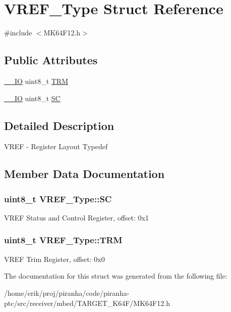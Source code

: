 \hypertarget{structVREF__Type}{}\section{V\+R\+E\+F\+\_\+\+Type Struct Reference}
\label{structVREF__Type}


{\ttfamily \#include $<$M\+K64\+F12.\+h$>$}

\subsection*{Public Attributes}
\begin{DoxyCompactItemize}
\item 
\hyperlink{core__sc300_8h_aec43007d9998a0a0e01faede4133d6be}{\+\_\+\+\_\+\+IO} uint8\+\_\+t \hyperlink{structVREF__Type_a374f2e0a8c240329890c6847d8560737}{T\+RM}
\item 
\hyperlink{core__sc300_8h_aec43007d9998a0a0e01faede4133d6be}{\+\_\+\+\_\+\+IO} uint8\+\_\+t \hyperlink{structVREF__Type_a93380066788c4a4c715990e2d34ec5b1}{SC}
\end{DoxyCompactItemize}


\subsection{Detailed Description}
V\+R\+EF -\/ Register Layout Typedef 

\subsection{Member Data Documentation}
\subsubsection[{\texorpdfstring{SC}{SC}}]{ uint8\+\_\+t V\+R\+E\+F\+\_\+\+Type\+::\+SC}\hypertarget{structVREF__Type_a93380066788c4a4c715990e2d34ec5b1}{}\label{structVREF__Type_a93380066788c4a4c715990e2d34ec5b1}
V\+R\+EF Status and Control Register, offset\+: 0x1 
\subsubsection[{\texorpdfstring{T\+RM}{TRM}}]{ uint8\+\_\+t V\+R\+E\+F\+\_\+\+Type\+::\+T\+RM}\hypertarget{structVREF__Type_a374f2e0a8c240329890c6847d8560737}{}\label{structVREF__Type_a374f2e0a8c240329890c6847d8560737}
V\+R\+EF Trim Register, offset\+: 0x0 

The documentation for this struct was generated from the following file\+:\begin{DoxyCompactItemize}
\item 
/home/erik/proj/piranha/code/piranha-\/ptc/src/receiver/mbed/\+T\+A\+R\+G\+E\+T\+\_\+\+K64\+F/M\+K64\+F12.\+h\end{DoxyCompactItemize}
